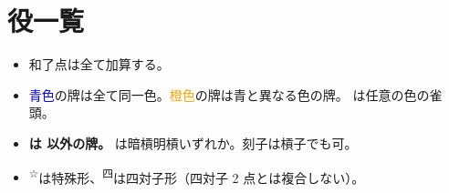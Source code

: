 \documentclass[line_length=40zw,head_space=2cm,foot_space=1cm,landscape,twocolumn,]{jlreq}
\newcommand{\特殊}{\textsuperscript ☆}
\newcommand{\四対子}{\textsuperscript 四}
\begin{document}
\section{役一覧}
\begin{itemize}
	\item 和了点は全て加算する。
	\item \textcolor{blue}{青色}の牌は全て同一色。\textcolor{orange}{橙色}の牌は青と異なる色の牌。
		\xq*{3}{?} は任意の色の雀頭。
	\item \textbf{ は  以外の牌。}
		\xq*{B}{A}は暗槓明槓いずれか。刻子は槓子でも可。
	\item \特殊 は特殊形、\四対子 は四対子形（四対子 2 点とは複合しない）。
\end{itemize}
\end{document}
